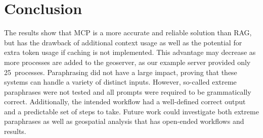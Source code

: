 \section{Conclusion}
\label{sec:conclusion}

The results show that MCP is a more accurate and reliable solution than RAG, but has the drawback
of additional context usage as well as the potential for extra token usage if caching is not
implemented. This advantage may decrease as more processes are added to the geoserver, as our
example server provided only 25~processes. Paraphrasing did not have a large impact, proving that
these systems can handle a variety of distinct inputs. However, so-called extreme paraphrases were
not tested and all prompts were required to be grammatically correct. Additionally, the intended
workflow had a well-defined correct output and a predictable set of steps to take. Future work
could investigate both extreme paraphrases as well as geospatial analysis that has open-ended
workflows and results.
